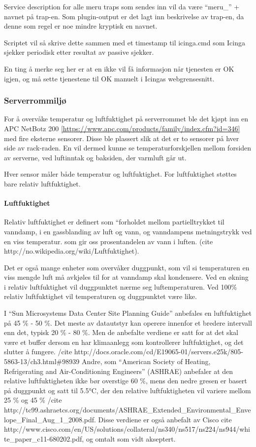Service description for alle meru traps som sendes inn vil da være “meru\_” + navnet på trap-en. Som plugin-output er det lagt inn beskrivelse av trap-en, da denne som regel er noe mindre kryptisk en navnet.

Scriptet vil så skrive dette sammen med et timestamp til icinga.cmd som Icinga sjekker periodisk etter resultat av passive sjekker.

En ting å merke seg her er at en ikke vil få informasjon når tjenesten er OK igjen, og må sette tjenestene til OK manuelt i Icingas webgrensesnitt.

\subsubsection{Serverrommiljø}

For å overvåke temperatur og luftfuktighet på serverrommet ble det kjøpt inn en APC NetBotz 200 \ref{https://www.apc.com/products/family/index.cfm?id=346} med fire eksterne sensorer. Disse ble plassert slik at det er to sensorer på hver side av rack-raden. En vil dermed kunne se temperaturforskjellen mellom forsiden av serverne, ved luftinntak og baksiden, der varmluft går ut.

Hver sensor måler både temperatur og luftfuktighet. For luftfuktighet støttes bare relativ luftfuktighet.

\paragraph{Luftfuktighet}

Relativ luftfuktighet er definert som “forholdet mellom partielltrykket til vanndamp, i en gassblanding av luft og vann, og vanndampens metningstrykk ved en viss temperatur. som gir oss prosentandelen av vann i luften. (cite http://no.wikipedia.org/wiki/Luftfuktighet). 

Det er også mange enheter som overvåker duggpunkt, som vil si temperaturen en viss mengde luft må avkjøles til for at vanndamp skal kondensere. Ved en økning i relativ luftfuktighet vil duggpunktet nærme seg luftemperaturen. Ved 100\% relativ luftfuktighet vil temperaturen og duggpunktet være like. 

I “Sun Microsystems Data Center Site Planning Guide” anbefales en luftfuktighet på 45 \% - 50 \%. Det meste av datautstyr kan operere innenfor et bredere intervall enn det, typisk 20 \% - 80 \%. Men de anbefalte verdiene er satt for at det skal være et buffer dersom en har klimaanlegg som kontrollerer luftfuktighet, og det slutter å fungere. /cite http://docs.oracle.com/cd/E19065-01/servers.e25k/805-5863-13/ch3.html\#98939 Andre, som “American Society of Heating, Refrigerating and Air-Conditioning Engineers” (ASHRAE) anbefaler at den relative luftfuktigheten ikke bør overstige 60 \%, mens den nedre gresen er basert på duggpunkt og satt til 5.5°C, der den relative luftfuktigheten vil variere mellom 25 \% og 45 \% /cite http://tc99.ashraetcs.org/documents/ASHRAE\_Extended\_Environmental\_Envelope\_Final\_Aug\_1\_2008.pdf. Disse verdiene er også anbefalt av Cisco cite http://www.cisco.com/en/US/solutions/collateral/ns340/ns517/ns224/ns944/white\_paper\_c11-680202.pdf, og omtalt som vidt akseptert. 

